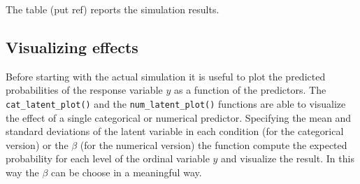 \documentclass[
  man,floatsintext]{apa6}
\begin{document}
\scriptsize

\normalsize

The table (put ref) reports the simulation results.

\scriptsize

\normalsize

\subsection{Visualizing effects}\label{visualizing-effects}

Before starting with the actual simulation it is useful to plot the predicted probabilities of the response variable \(y\) as a function of the predictors. The \texttt{cat\_latent\_plot()} and the \texttt{num\_latent\_plot()} functions are able to visualize the effect of a single categorical or numerical predictor. Specifying the mean and standard deviations of the latent variable in each condition (for the categorical version) or the \(\beta\) (for the numerical version) the function compute the expected probability for each level of the ordinal variable \(y\) and visualize the result. In this way the \(\beta\) can be choose in a meaningful way.

\scriptsize
\end{document}
